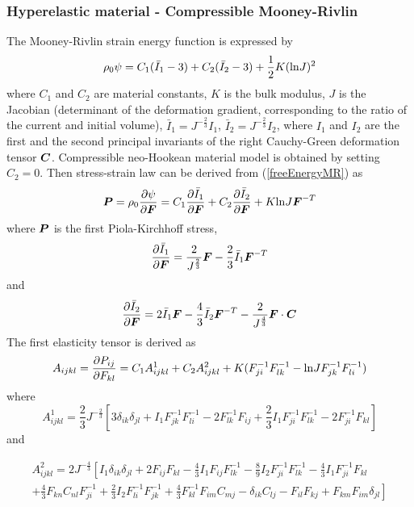 \documentclass[a4paper]{article}
\newcommand{\mbf}[1]{\mbox{\boldmath$#1$}}
\begin{document}
\subsubsection{Hyperelastic material - Compressible Mooney-Rivlin}
The Mooney-Rivlin strain energy function is expressed by
\begin{equation}\label{freeEnergyMR}
	\rho_0 \psi = C_1(\bar{I}_1-3) + C_2(\bar{I}_2-3) + \frac{1}{2}K ({\rm ln} J)^2
\end{equation}
where $C_1$ and $C_2$ are material constants, $K$ is the bulk modulus, $J$ is the Jacobian (determinant of the deformation gradient, corresponding to the ratio of the current and initial volume),  $\bar{I}_1 = J^{-\frac{2}{3}} I_1$, $\bar{I}_2 = J^{-\frac{2}{3}} I_2$, 
where $I_1$ and $I_2$ are the first and the second principal invariants of the right Cauchy-Green deformation tensor $\mbf{C}$.
Compressible neo-Hookean material model is obtained by setting $C_2 = 0$.
Then stress-strain law can be derived from (\ref{freeEnergyMR}) as
\begin{equation}
	\mbf{P} = \rho_0 \frac{\partial \psi}{\partial \mbf{F}} = C_1 \frac{\partial\bar{I}_1}{\partial\mbf{F}} + C_2\frac{\partial\bar{I}_2}{\partial\mbf{F}} + K {\rm ln}J \mbf{F}^{-T}
\end{equation}
where
$\mbf{P}$ is the first Piola-Kirchhoff stress,
\begin{equation}
 \frac{\partial \bar{I}_1}{\partial\mbf{F}} = \frac{2}{J^{\frac{2}{3}}}\mbf{F} - \frac{2}{3}\bar{I}_1\mbf{F}^{-T}
\end{equation}
and
\begin{equation}
\frac{\partial \bar{I}_2}{\partial\mbf{F}} = 2\bar{I}_1\mbf{F}-\frac{4}{3}\bar{I}_2\mbf{F}^{-T}-\frac{2}{J^\frac{4}{3}}\mbf{F}\cdot \mbf{C}
\end{equation}
The first elasticity tensor is derived as
\begin{equation}
A_{ijkl} = \frac{\partial P_{ij}}{\partial F_{kl}} = C_1 A^1_{ijkl} + C_2  A^2_{ijkl} + K(F_{ji}^{-1}F_{lk}^{-1} - {\rm ln}J F_{jk}^{-1}F_{li}^{-1})
\end{equation}
where 
\begin{equation}
A^1_{ijkl} = \frac{2}{3} J^{-\frac{2}{3}}\left[3\delta_{ik}\delta_{jl} + I_{1}F_{jk}^{-1}F_{li}^{-1} - 2F_{lk}^{-1}F_{ij}+\frac{2}{3}I_1 F_{ji}^{-1}F_{lk}^{-1}-2F_{ji}^{-1}F_{kl} \right]
\end{equation}
and

\begin{eqnarray}
A^2_{ijkl} = 2 J^{-\frac{4}{3}}\left[ I_1 \delta_{ik} \delta_{jl} + 2 F_{ij}F_{kl}-\frac{4}{3}I_1 F_{ij} F_{lk}^{-1} -\frac{8}{9}I_2 F_{ji}^{-1}F_{lk}^{-1}-\frac{4}{3}I_1 F_{ji}^{-1}F_{kl} \nonumber\right.\\ 
\left.  + \frac{4}{3} F_{kn}C_{nl}F_{ji}^{-1}  +\frac{2}{3}I_2 F_{li}^{-1}F_{jk}^{-1} + \frac{4}{3}F_{kl}^{-1}F_{im}C_{mj} - \delta_{ik}C_{lj} - F_{il}F_{kj} + F_{km}F_{im}\delta_{jl}\right]
\end{eqnarray}
\end{document}
